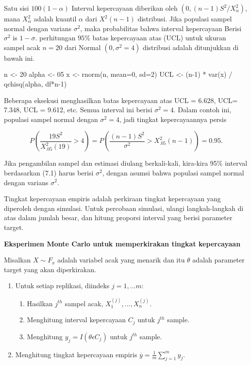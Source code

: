 \documentclass[a4paper,12pt]{article}
\theoremstyle{definition}
\begin{document}
Satu sisi $100(1-\alpha)$ Interval kepercayaan diberikan oleh $ \left ( 0, \left ( n - 1 \right ) S^{2}/X_{\alpha}^{2} \right )$, mana $X^{2}_{\alpha}$ adalah kuantil $\alpha$ dari $X^{2}\left (n-1 \right )$ distribusi. Jika populasi sampel
normal dengan varians $\sigma ^{2}$, maka probabilitas bahwa interval kepercayaan
Berisi $\sigma ^{2}$ is $1-\sigma$. perhitungan $95\%$ batas kepercayaan atas (UCL) untuk ukuran sampel acak $n = 20$ dari Normal $(0, \sigma ^{2}=4)$ distribusi adalah ditunjukkan di bawah ini.

\begin{spverbatim}
    n <- 20
    alpha <- 05
    x <- rnorm(n, mean=0, sd=2)
    UCL <- (n-1) * var(x) / qchisq(alpha, df*n-1)
\end{spverbatim}

Beberapa eksekusi menghasilkan batas kepercayaan atas UCL = 6.628, UCL= 7.348, UCL = 9.612, etc. Semua interval ini berisi $\sigma^{2}=4$. Dalam contoh ini,
populasi sampel normal dengan $\sigma^{2}=4$, jadi tingkat kepercayaannya persis

\begin{equation}
    P\left ( \frac{19S^{2}}{X^{2}_{.05}\left ( 19 \right )} > 4 \right ) = P\left ( \frac{(n-1)S^{2}}{\sigma ^{2}}>X^{2}_{.05}(n-1)\right ) = 0.95.
\end{equation}

Jika pengambilan sampel dan estimasi diulang berkali-kali, kira-kira 95\%  interval berdasarkan (7.1) harus berisi $\sigma^{2}$, dengan asumsi bahwa populasi sampel normal dengan varians $\sigma^{2}$.

Tingkat kepercayaan empiris adalah perkiraan tingkat kepercayaan yang diperoleh dengan simulasi. Untuk percobaan simulasi, ulangi langkah-langkah di atas dalam jumlah besar, dan hitung proporsi interval yang berisi parameter target.

\textbf{Eksperimen Monte Carlo untuk memperkirakan tingkat kepercayaan}

Misalkan $X \sim F_{x}$ adalah variabel acak yang menarik dan itu $\theta$ adalah parameter target yang akan diperkirakan.

\begin{enumerate}
    \item Untuk setiap replikasi, diindeks $j=1,...m:$
    \begin{enumerate}
        \item Hasilkan $j^{th}$ sampel acak, $X^{(j)}_{1},...,X_{n}^{(j)}.$
        \item Menghitung interval kepercayaan $C_{j}$ untuk $j^{th}$ sample.
        \item Menghitung $y_{j} = I(\theta \epsilon C _{j})$ untuk $j^{th}$ sample.
    \end{enumerate}
    \item Menghitung tingkat kepercayaan empiris $\overline{y} = \frac{1}{m}\sum_{j=1}^{m}y_{j}.$
\end{enumerate}
\end{document}
